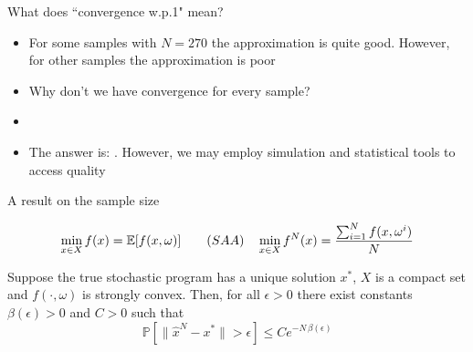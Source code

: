  
 
\begin{frame}{What does ``convergence w.p.1" mean?}


\begin{itemize}
\item For some samples with $N=270$ the approximation is quite good. However, for other samples the approximation is poor
\pula

\item Why don't we have convergence for every sample?
\pula
\pause

\item {}
\end{itemize}

\pula
{}

\pause
\begin{itemize}
\item The answer is: . However, we may employ simulation and statistical tools to access quality
\end{itemize}

 \end{frame} 


\begin{frame}{A result on the sample size}

\[
 \min_{x \in X} f(x)=\mathbb{E}[f(x,\omega)] \quad \quad (SAA) \quad \min_{x \in X} f^N(x)=\frac{\sum_{i=1}^N f(x,\omega^i)}{N}
\]


\begin{theorem}
Suppose the true stochastic program has a unique solution $x^*$, $X$ is a compact set and $f(\cdot, \omega)$ is strongly convex. 
Then, for all $\epsilon >0$ there exist constants $\beta(\epsilon)>0$ and $C>0$ such that
\[
\mathbb{P}[\|\hat x^N- x^*\|>\epsilon] \leq  C e^{-N\,\beta(\epsilon)}
\]

\pause 

\pula

\end{theorem}

 \end{frame} 
  
